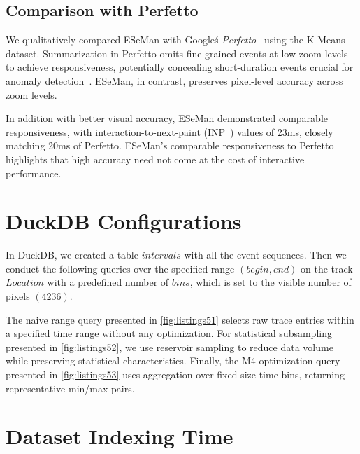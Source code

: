 \begin{refsection}

\subsection{Comparison with Perfetto}
We qualitatively compared ESeMan with Google\'s \emph{Perfetto}~\cite{Perfetto} using the K-Means dataset. Summarization in Perfetto omits fine-grained events at low zoom levels to achieve responsiveness, potentially concealing short-duration events crucial for anomaly detection~\cite{guo2021survey}. ESeMan, in contrast, preserves pixel-level accuracy across zoom levels.

In addition with better visual accuracy, ESeMan demonstrated comparable responsiveness, with interaction-to-next-paint (INP~\cite{inp_webdev}) values of 23ms, closely matching 20ms of Perfetto. ESeMan's comparable responsiveness to Perfetto highlights that high accuracy need not come at the cost of interactive performance.


\section{DuckDB Configurations}
In DuckDB, we created a table $intervals$ with all the event sequences. Then we conduct the following queries over the specified range $(begin, end)$ on the track $Location$ with a predefined number of $bins$, which is set to the visible number of pixels $(4236)$.

The naive range query presented in \autoref{fig:listings51} selects raw trace entries within a specified time range without any optimization. For statistical subsampling presented in \autoref{fig:listings52}, we use reservoir sampling to reduce data volume while preserving statistical characteristics. Finally, the M4 optimization query presented in \autoref{fig:listings53} uses aggregation over fixed-size time bins, returning representative min/max pairs.

\section{Dataset Indexing Time}


\end{refsection}
